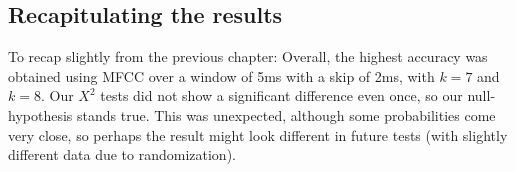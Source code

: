  \subsection{Recapitulating the results}
 To recap slightly from the previous chapter: Overall, the highest accuracy was obtained using MFCC over a window of 5ms with a skip of 2ms, with $k=7$ and $k=8$. Our $X^2$ tests did not show a significant difference even once, so our null-hypothesis stands true. This was unexpected, although some probabilities come very close, so perhaps the result might look different in future tests (with slightly different data due to randomization).